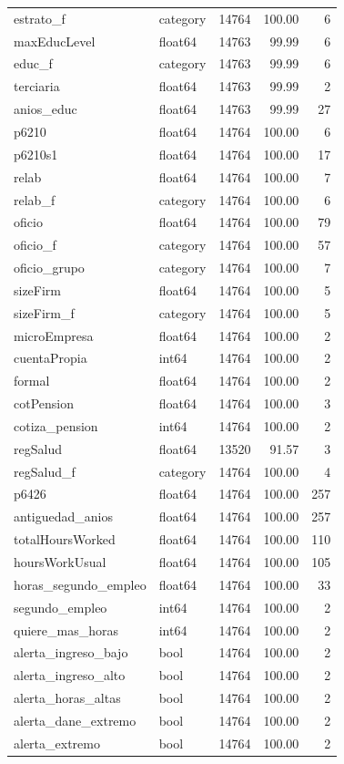 \begin{longtable}{llrrr}
estrato\_f & category & 14764 & 100.00 & 6 \\
maxEducLevel & float64 & 14763 & 99.99 & 6 \\
educ\_f & category & 14763 & 99.99 & 6 \\
terciaria & float64 & 14763 & 99.99 & 2 \\
anios\_educ & float64 & 14763 & 99.99 & 27 \\
p6210 & float64 & 14764 & 100.00 & 6 \\
p6210s1 & float64 & 14764 & 100.00 & 17 \\
relab & float64 & 14764 & 100.00 & 7 \\
relab\_f & category & 14764 & 100.00 & 6 \\
oficio & float64 & 14764 & 100.00 & 79 \\
oficio\_f & category & 14764 & 100.00 & 57 \\
oficio\_grupo & category & 14764 & 100.00 & 7 \\
sizeFirm & float64 & 14764 & 100.00 & 5 \\
sizeFirm\_f & category & 14764 & 100.00 & 5 \\
microEmpresa & float64 & 14764 & 100.00 & 2 \\
cuentaPropia & int64 & 14764 & 100.00 & 2 \\
formal & float64 & 14764 & 100.00 & 2 \\
cotPension & float64 & 14764 & 100.00 & 3 \\
cotiza\_pension & int64 & 14764 & 100.00 & 2 \\
regSalud & float64 & 13520 & 91.57 & 3 \\
regSalud\_f & category & 14764 & 100.00 & 4 \\
p6426 & float64 & 14764 & 100.00 & 257 \\
antiguedad\_anios & float64 & 14764 & 100.00 & 257 \\
totalHoursWorked & float64 & 14764 & 100.00 & 110 \\
hoursWorkUsual & float64 & 14764 & 100.00 & 105 \\
horas\_segundo\_empleo & float64 & 14764 & 100.00 & 33 \\
segundo\_empleo & int64 & 14764 & 100.00 & 2 \\
quiere\_mas\_horas & int64 & 14764 & 100.00 & 2 \\
alerta\_ingreso\_bajo & bool & 14764 & 100.00 & 2 \\
alerta\_ingreso\_alto & bool & 14764 & 100.00 & 2 \\
alerta\_horas\_altas & bool & 14764 & 100.00 & 2 \\
alerta\_dane\_extremo & bool & 14764 & 100.00 & 2 \\
alerta\_extremo & bool & 14764 & 100.00 & 2 \\
\end{longtable}
